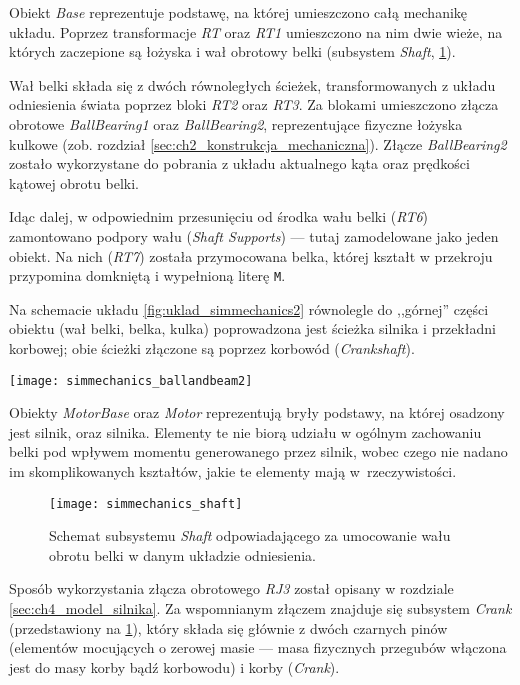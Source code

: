 Obiekt \textit{Base} reprezentuje podstawę, na której umieszczono całą mechanikę układu. Poprzez transformacje \textit{RT} oraz \textit{RT1} umieszczono na nim dwie wieże, na których zaczepione są łożyska i wał obrotowy belki (subsystem \textit{Shaft}, \cref{fig:sm_shaft}).

Wał belki składa się z dwóch równoległych ścieżek, transformowanych z układu odniesienia świata poprzez bloki \textit{RT2} oraz \textit{RT3}. Za blokami umieszczono złącza obrotowe \textit{BallBearing1} oraz \textit{BallBearing2}, reprezentujące fizyczne łożyska kulkowe (zob. rozdział \ref{sec:ch2_konstrukcja_mechaniczna}). Złącze \textit{BallBearing2} zostało wykorzystane do pobrania z układu aktualnego kąta oraz prędkości kątowej obrotu belki.

Idąc dalej, w odpowiednim przesunięciu od środka wału belki (\textit{RT6}) zamontowano podpory wału (\textit{Shaft Supports}) --- tutaj zamodelowane jako jeden obiekt. Na nich (\textit{RT7}) została przymocowana belka, której kształt w przekroju przypomina domkniętą i wypełnioną literę \texttt{M}.

Na schemacie układu \ref{fig:uklad_simmechanics2} równolegle do ,,górnej'' części obiektu (wał belki, belka, kulka) poprowadzona jest ścieżka silnika i przekładni korbowej; obie ścieżki złączone są poprzez korbowód (\textit{Crankshaft}).

\begin{sidewaysfigure}[p!]
    \centering
    \texttt{[image: simmechanics\_ballandbeam2]}
    \caption{Schemat \textsc{SimMechanics} układu kulki i belki.}
    \label{fig:uklad_simmechanics2}
\end{sidewaysfigure}

Obiekty \textit{MotorBase} oraz \textit{Motor} reprezentują bryły podstawy, na której osadzony jest silnik, oraz silnika. Elementy te nie biorą udziału w ogólnym zachowaniu belki pod wpływem momentu generowanego przez silnik, wobec czego nie nadano im skomplikowanych kształtów, jakie te elementy mają w~rzeczywistości.

\begin{figure}[h]
    \centering
    \texttt{[image: simmechanics\_shaft]}
    \caption{Schemat subsystemu \textit{Shaft} odpowiadającego za umocowanie wału obrotu belki w danym układzie odniesienia.}
    \label{fig:sm_shaft}
\end{figure}

Sposób wykorzystania złącza obrotowego \textit{RJ3} został opisany w rozdziale \ref{sec:ch4_model_silnika}. Za wspomnianym złączem znajduje się subsystem \textit{Crank} (przedstawiony na \cref{fig:sm_shaft}), który składa się głównie z dwóch czarnych pinów (elementów mocujących o zerowej masie --- masa fizycznych przegubów włączona jest do masy korby bądź korbowodu) i korby (\textit{Crank}).

